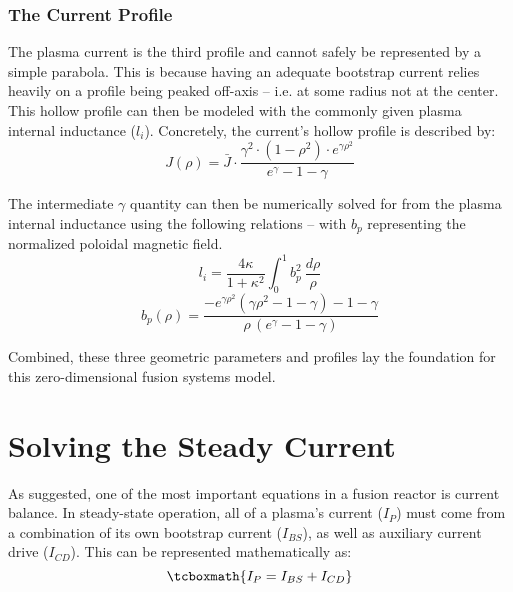 \subsubsection{The Current  Profile}

The plasma current  is the third profile and cannot safely be represented by a simple parabola. This is because having an adequate bootstrap current relies heavily on a profile being peaked off-axis -- i.e. at some radius not at the center. This hollow profile can then be modeled with the commonly given plasma internal inductance ($l_i$). Concretely, the current's hollow profile is described by:
\begin{equation}
	J(\rho) = \bar{J} \cdot \frac{ \gamma ^ 2 \cdot ( 1 - \rho ^ 2 ) \cdot e^{ \gamma \rho^2 } }{ e^\gamma - 1 - \gamma}
\end{equation}

The intermediate $\gamma$ quantity can then be numerically solved for from the plasma internal inductance using the following relations -- with $b_p$ representing the normalized poloidal magnetic field. 
\begin{equation}
	l_i = \frac{4 \kappa}{1+\kappa^2}	 \int_0^1 b_p^2 \ \frac{d\rho}{\rho}
\end{equation}
\begin{equation}
	\label{eq:b_p}
	b_p(\rho) = \frac{ -e^{\gamma\rho^2} ( \gamma\rho^2 - 1 - \gamma ) - 1 - \gamma }{\rho \,( e^\gamma - 1 - \gamma ) }
\end{equation}

Combined, these three geometric parameters and profiles lay the foundation for this zero-dimensional fusion systems model.

\section{Solving the Steady Current}

As suggested, one of the most important equations in a fusion reactor is current balance. In steady-state operation, all of a plasma's current ($I_P$) must come from a combination of its own bootstrap current ($I_{BS}$), as well as auxiliary current drive ($I_{CD}$). This can be represented mathematically as:
\begin{equation}
	\label{eq:ibal}
	\tcboxmath{
	I_P = I_{BS} + I_{CD}
	}
\end{equation}

